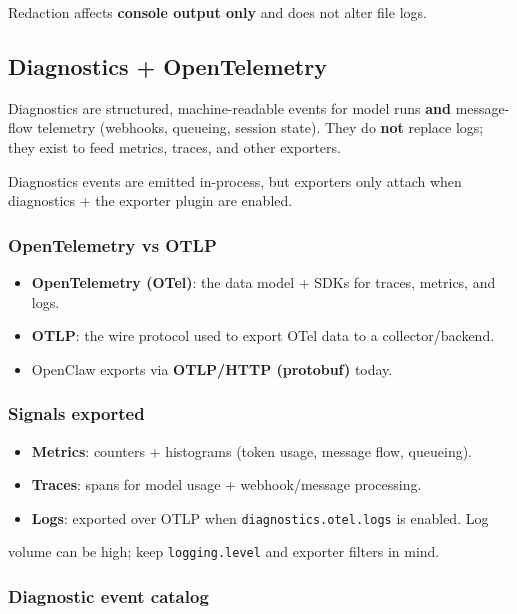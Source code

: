 Redaction affects \textbf{console output only} and does not alter file logs.

\subsection{Diagnostics + OpenTelemetry}


Diagnostics are structured, machine-readable events for model runs \textbf{and}
message-flow telemetry (webhooks, queueing, session state). They do \textbf{not}
replace logs; they exist to feed metrics, traces, and other exporters.

Diagnostics events are emitted in-process, but exporters only attach when
diagnostics + the exporter plugin are enabled.

\subsubsection{OpenTelemetry vs OTLP}


\begin{itemize}
  \item \textbf{OpenTelemetry (OTel)}: the data model + SDKs for traces, metrics, and logs.
  \item \textbf{OTLP}: the wire protocol used to export OTel data to a collector/backend.
  \item OpenClaw exports via \textbf{OTLP/HTTP (protobuf)} today.
\end{itemize}


\subsubsection{Signals exported}


\begin{itemize}
  \item \textbf{Metrics}: counters + histograms (token usage, message flow, queueing).
  \item \textbf{Traces}: spans for model usage + webhook/message processing.
  \item \textbf{Logs}: exported over OTLP when \texttt{diagnostics.otel.logs} is enabled. Log
\end{itemize}

volume can be high; keep \texttt{logging.level} and exporter filters in mind.

\subsubsection{Diagnostic event catalog}


